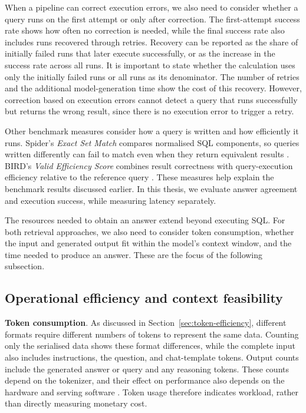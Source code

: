 When a pipeline can correct execution errors, we also need to consider whether a query runs on the first
attempt or only after correction. The first-attempt success rate shows how often no correction is needed,
while the final success rate also includes runs recovered through retries. Recovery can be reported as the
share of initially failed runs that later execute successfully, or as the increase in the success rate across
all runs. It is important to state whether the calculation uses only the initially failed runs or all runs as
its denominator. The number of retries and the additional model-generation time show the cost of this
recovery. However, correction based on execution errors cannot detect a query that runs successfully but
returns the wrong result, since there is no execution error to trigger a retry.

Other benchmark measures consider how a query is written and how efficiently it runs. Spider's \emph{Exact
Set Match} compares normalised SQL components, so queries written differently can fail to match even when
they return equivalent results \cite{yu2018spider}. BIRD's \emph{Valid Efficiency Score} combines result
correctness with query-execution efficiency relative to the reference query \cite{li2023can}. These measures
help explain the benchmark results discussed earlier. In this thesis, we evaluate answer agreement and
execution success, while measuring latency separately.

The resources needed to obtain an answer extend beyond executing SQL. For both retrieval approaches, we also
need to consider token consumption, whether the input and generated output fit within the model's context
window, and the time needed to produce an answer. These are the focus of the following subsection.

\subsection{Operational efficiency and context feasibility} \label{sec:operational-metrics}

\textbf{Token consumption}. As discussed in Section~\ref{sec:token-efficiency}, different formats require
different numbers of tokens to represent the same data. Counting only the serialised data shows these format
differences, while the complete input also includes instructions, the question, and chat-template tokens.
Output counts include the generated answer or query and any reasoning tokens. These counts depend on the
tokenizer, and their effect on performance also depends on the hardware and serving software
\cite{fernandez2025energy}. Token usage therefore indicates workload, rather than directly measuring monetary cost.

